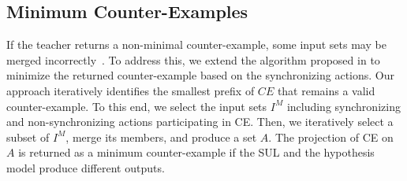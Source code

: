 \subsection{Minimum Counter-Examples}
If the teacher returns a non-minimal counter-example, some input sets may be merged incorrectly~\cite{30}. 
To address this, we extend the algorithm proposed in \cite{30} to minimize the returned counter-example based on the synchronizing actions. Our approach iteratively identifies the smallest prefix of $CE$ that remains a valid counter-example.   To this end, we select the input sets  $I^M$ including synchronizing and non-synchronizing actions participating in  CE. Then, we iteratively select a subset of $I^M$, merge its members, and produce a set $A$. The projection of CE on $A$ is returned as a minimum counter-example if the SUL and the hypothesis model produce
different outputs.%
